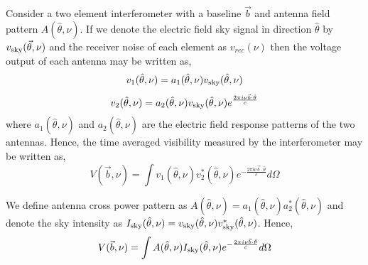 \documentclass[12pt,preprint]{aastex}
\newcommand{\volt}{{v}}
\newcommand{\vis}{{V}}
\newcommand{\sky}{{\rm sky}}
\newcommand{\bmvolt}{{a}}
\newcommand{\bm}{{A}}
\newcommand{\thhat}{{\hat\theta}}
\newcommand{\fngexp}{{e^{\frac{2\pi i\nu\vec{b}\cdot\thhat}{c}}}}
\newcommand{\ifngexp}{{e^{-\frac{2\pi i\nu\vec{b}\cdot\thhat}{c}}}}
\begin{document}
Consider a two element interferometer with a baseline $\vec b$ and antenna field pattern $A(\thhat, \nu)$. If we denote the electric field sky signal in direction $\thhat$ by $\volt_\sky(\vec \theta, \nu)$ and the receiver noise of each element as $\volt_{rec}(\nu)$ then the voltage output of each antenna may be written as,  
\begin{equation}
\volt_{1}(\thhat, \nu) = \bmvolt_{1}(\thhat,\nu)\volt_\sky(\thhat,\nu)\nonumber\\
\end{equation}
\begin{equation}
\volt_{2} (\thhat, \nu)= \bmvolt_{2}(\thhat,\nu)\volt_\sky(\thhat,\nu)\fngexp\nonumber\\
\end{equation}
where $\bmvolt_{1}(\thhat,\nu)$ and $\bmvolt_{2}(\thhat,\nu)$ are the electric field response patterns 
of the two antennas.
Hence, the time averaged visibility measured by the interferometer may be written as, 
\begin{equation}
\vis(\vec b, \nu) =  \int  \volt_{1}(\thhat,\nu)  \volt_{2}^{*} (\thhat, \nu) \ifngexp d\Omega 
\label{eq1}
\end{equation}

We define antenna cross power pattern as  $\bm(\thhat,\nu)=\bmvolt_{1}(\thhat,\nu)\bmvolt_{2}^{*}(\thhat,\nu)$ and denote the sky intensity as  $I_\sky(\thhat,\nu)=\volt_\sky(\thhat,\nu)\volt_\sky^{*}(\thhat,\nu)$. Hence, 
\begin{equation}
\vis(\vec b,\nu) = \int \bm(\thhat, \nu) I_\sky(\thhat,\nu) \ifngexp d\Omega
\label{eq2}
\end{equation}
\end{document}
